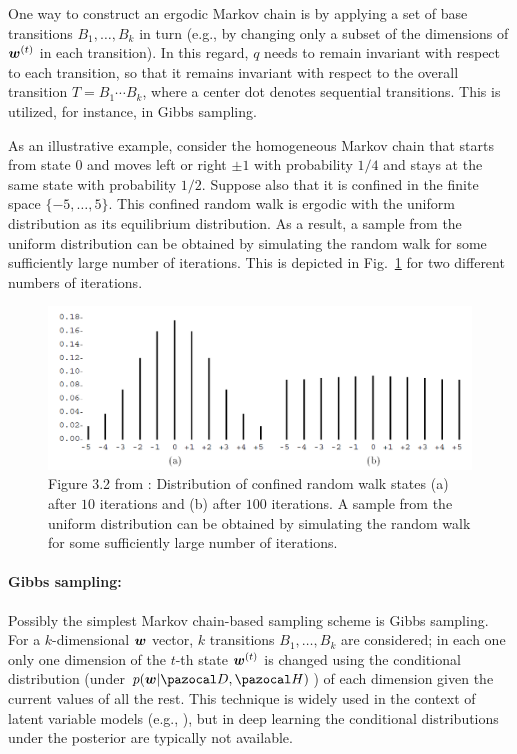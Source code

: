 One way to construct an ergodic Markov chain is by applying a set of base transitions $B_1,\dots,B_k$ in turn (e.g., by changing only a subset of the dimensions of $\boldsymbol{w}^{(t)}$ in each transition). 
In this regard, $q$ needs to remain invariant with respect to each transition, so that it remains invariant with respect to the overall transition $T=B_1\cdots B_k$, where a center dot denotes sequential transitions.
This is utilized, for instance, in Gibbs sampling.

As an illustrative example, consider the homogeneous Markov chain that starts from state $0$ and moves left or right $\pm 1$ with probability $1/4$ and stays at the same state with probability $1/2$. 
Suppose also that it is confined in the finite space $\{-5,\dots,5\}$. 
This confined random walk is ergodic with the uniform distribution as its equilibrium distribution. 
As a result, a sample from the uniform distribution can be obtained by simulating the random walk for some sufficiently large number of iterations. 
This is depicted in Fig.~\ref{fig:mc} for two different numbers of iterations. 
\begin{figure}
	\centering
	\includegraphics[width=0.85\linewidth]{./Figures/mc.png}
	\caption{Figure 3.2 from \textcite{neal1993probabilistic}: Distribution of confined random walk states (a) after $10$ iterations and (b) after $100$ iterations. 
	A sample from the uniform distribution can be obtained by simulating the random walk for some sufficiently large number of iterations.}
	\label{fig:mc}
\end{figure} 

\paragraph{Gibbs sampling:}\label{sec:gibbs}
Possibly the simplest Markov chain-based sampling scheme is Gibbs sampling. 
For a $k$-dimensional $\boldsymbol{w}$ vector, $k$ transitions $B_1,\dots,B_k$ are considered; in each one only one dimension of the $t$-th state $\boldsymbol{w}^{(t)}$ is changed using the conditional distribution (under $p(\bw|\cD,\cH)$) of each dimension given the current values of all the rest.
This technique is widely used in the context of latent variable models (e.g., \cite{blei2014build}), but in deep learning the conditional distributions under the posterior are typically not available. 

